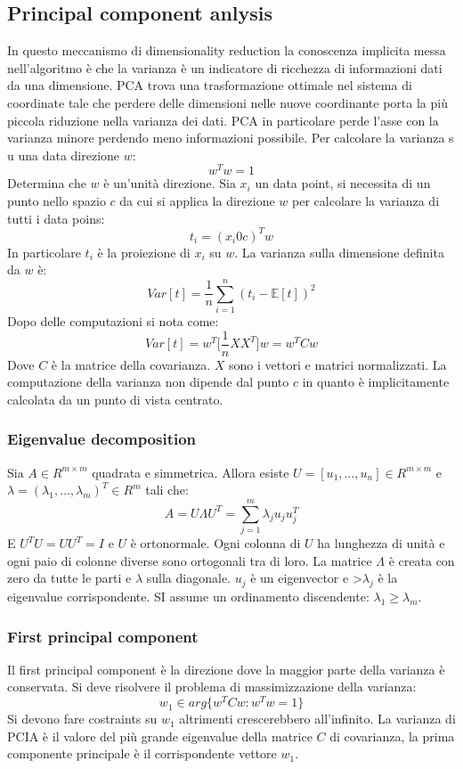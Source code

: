 	\subsection{Principal component anlysis}
	In questo meccanismo di dimensionality reduction la conoscenza implicita messa nell'algoritmo \`e che la varianza \`e un indicatore di ricchezza di informazioni dati da una dimensione.
	PCA trova una trasformazione ottimale nel sistema di coordinate tale che perdere delle dimensioni nelle nuove coordinante porta la pi\`u piccola riduzione nella varianza dei dati.
	PCA in particolare  perde l'asse con la varianza minore perdendo meno informazioni possibile.
	Per calcolare la varianza s u una data direzione $w$:
	$$w^Tw=1$$
	Determina che $w$ \`e un'unit\`a direzione.
	Sia $x_i$ un data point, si necessita di un punto nello spazio $c$ da cui si applica la direzione $w$ per calcolare la varianza di tutti i data poins:
	$$t_i = (x_i 0c)^Tw$$
	In particolare $t_i$ \`e la proiezione di $x_i$ su $w$.
	La varianza sulla dimensione definita da $w$ \`e:
	$$Var[t] = \frac{1}{n}\sum\limits_{i = 1}^n(t_i -\mathbb{E}[t])^2$$
	Dopo delle computazioni si nota come:
	$$Var[t] = w^T\bigl[\frac{1}{n} XX^T\bigr]w = w^TCw$$
	Dove $C$ \`e la matrice della covarianza.
	$X$ sono i vettori e matrici normalizzati.
	La computazione della varianza non dipende dal punto $c$ in quanto \`e implicitamente calcolata da un punto di vista centrato.

		\subsubsection{Eigenvalue decomposition}
		Sia $A\in R^{m\times m}$ quadrata e simmetrica.
		Allora esiste $U=[u_1,\dots,u_n]\in R^{m\times m}$ e $\lambda=(\lambda_1,\dots,\lambda_m)^T\in R^m$ tali che:
		$$A = U\Lambda U^T=\sum\limits_{j=1}^m\lambda_ju_ju_j^T$$
		E $U^TU=UU^T=I$ e $U$ \`e ortonormale.
		Ogni colonna di $U$ ha lunghezza di unit\`a e ogni paio di colonne diverse sono ortogonali tra di loro.
		La matrice $\Lambda$ \`e creata con zero da tutte le parti e $\lambda$ sulla diagonale.
		$u_j$ \`e un eigenvector e >$\lambda_j$ \`e la eigenvalue corrispondente.
		SI assume un ordinamento discendente: $\lambda_1\ge \lambda_m$.

		\subsubsection{First principal component}
		Il first principal component \`e la direzione dove la maggior parte della varianza \`e conservata.
		Si deve risolvere il problema di massimizzazione della varianza:
		$$w_1\in arg\{w^TCw:w^Tw=1\}$$
		Si devono fare costraints su $w_1$ altrimenti crescerebbero all'infinito.
		La varianza di PCIA \`e il valore del pi\`u grande eigenvalue della matrice $C$ di covarianza, la prima componente principale \`e il corrispondente vettore $w_1$.

